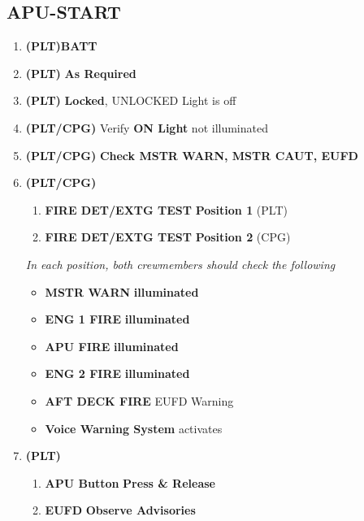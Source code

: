 \documentclass[fontHelvetica]{TechCheck}
\begin{document}
	\clearpage

	\subsection{APU-START}
	\begin{enumerate}[leftmargin=0.1\linewidth,rightmargin=0.1\linewidth, itemsep=4pt]
		\item {} \textbf{(PLT)}\cbstart \dotfill \textbf{BATT}\cbend
		\item {} \textbf{(PLT)} \dotfill \textbf{As Required}
		\item {} \textbf{(PLT)} \dotfill \textbf{Locked}, UNLOCKED Light is off
		\item {} \textbf{(PLT/CPG)} \dotfill Verify \textbf{ON Light} not illuminated
		\item {} \textbf{(PLT/CPG)} \dotfill \textbf{Check MSTR WARN, MSTR CAUT, EUFD}
		\item {} \textbf{(PLT/CPG)} 
		\begin{enumerate}[itemsep=4pt]
			\item \textbf{FIRE DET/EXTG TEST} \dotfill \textbf{Position 1} (PLT)
			\item \textbf{FIRE DET/EXTG TEST} \dotfill \textbf{Position 2} (CPG)
		\end{enumerate}
		\emph{In each position, both crewmembers should check the following}
		\begin{itemize}[itemsep=4pt]
			\item \textbf{MSTR WARN} \dotfill \textbf{illuminated}
			\item \textbf{ENG 1 FIRE} \dotfill \textbf{illuminated}
			\item \textbf{APU FIRE} \dotfill \textbf{illuminated}
			\item \textbf{ENG 2 FIRE} \dotfill \textbf{illuminated}
			\item \textbf{AFT DECK FIRE} \dotfill EUFD Warning
			\item \textbf{Voice Warning System} \dotfill activates
		\end{itemize}
		\item {} \textbf{(PLT)}\cbstart
		\begin{enumerate}[itemsep=4pt]
			\item \textbf{APU Button} \dotfill \textbf{Press \& Release}
			\item \textbf{EUFD} \dotfill \textbf{Observe Advisories}
			\begin{itemize}[itemsep=4pt]

\end{itemize}
\end{enumerate}
\end{enumerate}
\end{document}
